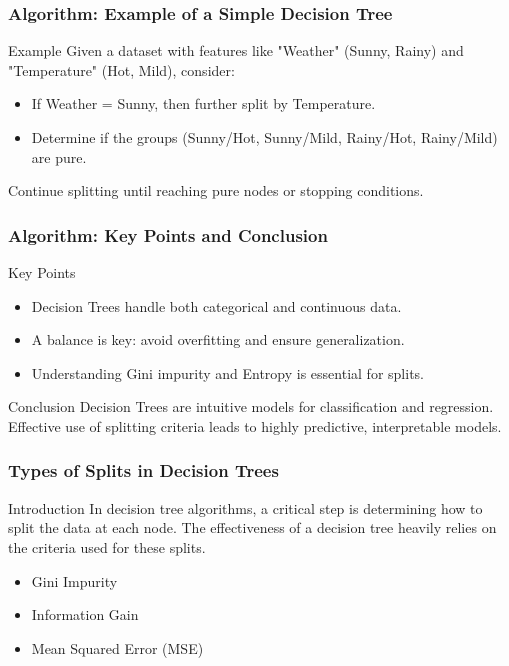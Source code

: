 \documentclass[aspectratio=169]{beamer}
\begin{document}
\begin{frame}[fragile]
    \frametitle{Algorithm: Example of a Simple Decision Tree}
    \begin{block}{Example}
        Given a dataset with features like "Weather" (Sunny, Rainy) and "Temperature" (Hot, Mild), consider:
        \begin{itemize}
            \item If Weather = Sunny, then further split by Temperature.
            \item Determine if the groups (Sunny/Hot, Sunny/Mild, Rainy/Hot, Rainy/Mild) are pure.
        \end{itemize}
        Continue splitting until reaching pure nodes or stopping conditions.
    \end{block}
\end{frame}

\begin{frame}[fragile]
    \frametitle{Algorithm: Key Points and Conclusion}
    \begin{block}{Key Points}
        \begin{itemize}
            \item Decision Trees handle both categorical and continuous data.
            \item A balance is key: avoid overfitting and ensure generalization.
            \item Understanding Gini impurity and Entropy is essential for splits.
        \end{itemize}
    \end{block}
    
    \begin{block}{Conclusion}
        Decision Trees are intuitive models for classification and regression. Effective use of splitting criteria leads to highly predictive, interpretable models.
    \end{block}
\end{frame}

\begin{frame}[fragile]
    \frametitle{Types of Splits in Decision Trees}
    
    \begin{block}{Introduction}
        In decision tree algorithms, a critical step is determining how to split the data at each node. The effectiveness of a decision tree heavily relies on the criteria used for these splits.
    \end{block}
    
    \begin{itemize}
        \item Gini Impurity
        \item Information Gain
        \item Mean Squared Error (MSE)
    \end{itemize}
    
\end{frame}
\end{document}
